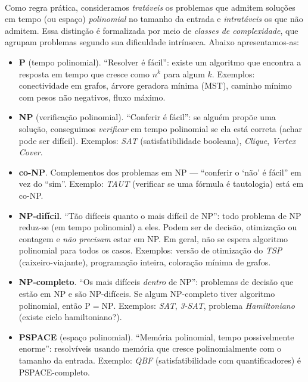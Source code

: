 \documentclass[12pt,a4paper]{article}
\begin{document}
\paragraph{}
 Como regra prática, consideramos \emph{tratáveis} os problemas que admitem soluções em tempo (ou espaço) \emph{polinomial} no tamanho da entrada e \emph{intratáveis} os que não admitem. Essa distinção é formalizada por meio de \emph{classes de complexidade}, que agrupam problemas segundo sua dificuldade intrínseca. Abaixo apresentamos-as:

\begin{itemize}\setlength{\itemsep}{2pt}
    \item \textbf{P} (tempo polinomial). “Resolver é fácil”: existe um algoritmo que encontra a resposta em tempo que cresce como \(n^k\) para algum \(k\). Exemplos: conectividade em grafos, árvore geradora mínima (MST), caminho mínimo com pesos não negativos, fluxo máximo.
    \item \textbf{NP} (verificação polinomial). “Conferir é fácil”: se alguém propõe uma solução, conseguimos \emph{verificar} em tempo polinomial se ela está correta (achar pode ser difícil). Exemplos: \emph{SAT} (satisfatibilidade booleana), \emph{Clique}, \emph{Vertex Cover}.
    \item \textbf{co-NP}. Complementos dos problemas em NP — “conferir o ‘não’ é fácil” em vez do “sim”. Exemplo: \emph{TAUT} (verificar se uma fórmula é tautologia) está em co-NP.
    \item \textbf{NP-difícil}. “Tão difíceis quanto o mais difícil de NP”: todo problema de NP reduz-se (em tempo polinomial) a eles. Podem ser de decisão, otimização ou contagem e \emph{não precisam} estar em NP. Em geral, não se espera algoritmo polinomial para todos os casos. Exemplos: versão de otimização do \emph{TSP} (caixeiro-viajante), programação inteira, coloração mínima de grafos.
    \item \textbf{NP-completo}. “Os mais difíceis \emph{dentro} de NP”: problemas de decisão que estão em NP e são NP-difíceis. Se algum NP-completo tiver algoritmo polinomial, então \(\mathrm{P}=\mathrm{NP}\). Exemplos: \emph{SAT}, \emph{3-SAT}, problema \emph{Hamiltoniano} (existe ciclo hamiltoniano?).
    \item \textbf{PSPACE} (espaço polinomial). “Memória polinomial, tempo possivelmente enorme”: resolvíveis usando memória que cresce polinomialmente com o tamanho da entrada. Exemplo: \emph{QBF} (satisfatibilidade com quantificadores) é PSPACE-completo.
\end{itemize}
\end{document}
